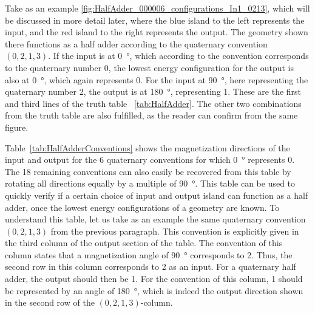 \documentclass[11pt,a4paper,english,twoside]{article}
\begin{document}
Take as an example \cref{fig:HalfAdder_000006_configurations_In1_0213}, which will be discussed in more detail later, where the blue island to the left represents the input, and the red island to the right represents the output. The geometry shown there functions as a half adder according to the quaternary convention $(0, 2, 1, 3)$. If the input is at \SI{0}{\degree}, which according to the convention corresponds to the quaternary number 0, the lowest energy configuration for the output is also at \SI{0}{\degree}, which again represents 0. For the input at \SI{90}{\degree}, here representing the quaternary number 2, the output is at \SI{180}{\degree}, representing 1. These are the first and third lines of the truth table~ \ref{tab:HalfAdder}. The other two combinations from the truth table are also fulfilled, as the reader can confirm from the same figure. \par
Table~\ref{tab:HalfAdderConventions} shows the magnetization directions of the input and output for the 6 quaternary conventions for which \SI{0}{\degree} represents 0. The 18 remaining conventions can also easily be recovered from this table by rotating all directions equally by a multiple of \SI{90}{\degree}. This table can be used to quickly verify if a certain choice of input and output island can function as a half adder, once the lowest energy configurations of a geometry are known. To understand this table, let us take as an example the same quaternary convention $(0, 2, 1, 3)$ from the previous paragraph. This convention is explicitly given in the third column of the output section of the table. The convention of this column states that a magnetization angle of \SI{90}{\degree} corresponds to 2. Thus, the second row in this column corresponds to 2 as an input. For a quaternary half adder, the output should then be 1. For the convention of this column, 1 should be represented by an angle of \SI{180}{\degree}, which is indeed the output direction shown in the second row of the $(0, 2, 1, 3)$-column.
 \par
\end{document}

